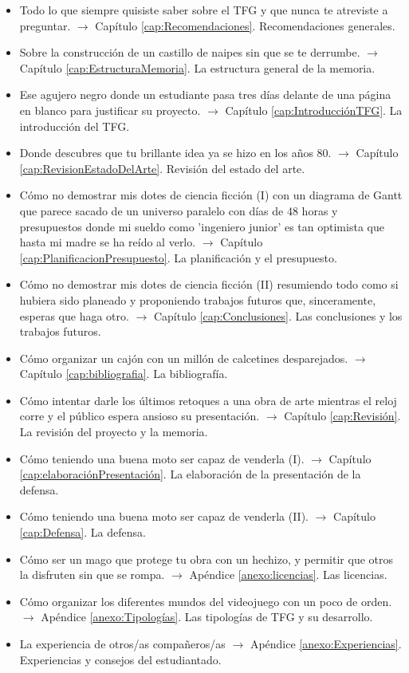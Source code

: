 \begin{itemize}
\item Todo lo que siempre quisiste saber sobre el TFG y que nunca te atreviste a preguntar. $\rightarrow$ Capítulo \ref{cap:Recomendaciones}. Recomendaciones generales.
\item Sobre la construcción de un castillo de naipes sin que se te derrumbe. $\rightarrow$ Capítulo \ref{cap:EstructuraMemoria}. La estructura general de la memoria.
\item Ese agujero negro donde un estudiante pasa tres días delante de una página en blanco para justificar su proyecto. $\rightarrow$ Capítulo \ref{cap:IntroducciónTFG}. La introducción del TFG.
\item Donde descubres que tu brillante idea ya se hizo en los años 80. $\rightarrow$ Capítulo \ref{cap:RevisionEstadoDelArte}. Revisión del estado del arte.
\item Cómo no demostrar mis dotes de ciencia ficción (I) con un diagrama de Gantt que parece sacado de un universo paralelo con días de 48 horas y presupuestos donde mi sueldo como 'ingeniero junior' es tan optimista que hasta mi madre se ha reído al verlo. $\rightarrow$ Capítulo \ref{cap:PlanificacionPresupuesto}. La planificación y el presupuesto.
\item Cómo no demostrar mis dotes de ciencia ficción (II) resumiendo todo como si hubiera sido planeado y proponiendo trabajos futuros que, sinceramente, esperas que haga otro. $\rightarrow$ Capítulo \ref{cap:Conclusiones}. Las conclusiones y los trabajos futuros.
\item Cómo organizar un cajón con un millón de calcetines desparejados. $\rightarrow$ Capítulo \ref{cap:bibliografia}. La bibliografía.
\item Cómo intentar darle los últimos retoques a una obra de arte mientras el reloj corre y el público espera ansioso su presentación. $\rightarrow$ Capítulo \ref{cap:Revisión}. La revisión del proyecto y la memoria.
\item Cómo teniendo una buena moto ser capaz de venderla (I). $\rightarrow$ Capítulo \ref{cap:elaboraciónPresentación}. La elaboración de la presentación de la defensa.
\item Cómo teniendo una buena moto ser capaz de venderla (II). $\rightarrow$ Capítulo \ref{cap:Defensa}. La defensa. 
\item Cómo ser un mago que protege tu obra con un hechizo, y permitir que otros la disfruten sin que se rompa. $\rightarrow$ Apéndice \ref{anexo:licencias}. Las licencias. 
\item Cómo organizar los diferentes mundos del videojuego con un poco de orden. $\rightarrow$ Apéndice \ref{anexo:Tipologías}. Las tipologías de TFG y su desarrollo.
\item La experiencia de otros/as compañeros/as $\rightarrow$ Apéndice \ref{anexo:Experiencias}. Experiencias y consejos del estudiantado. 
 \end{itemize}

